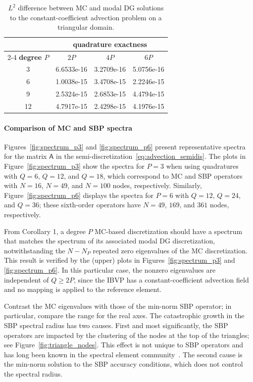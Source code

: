 \documentclass[pdflatex,sn-mathphys-num]{sn-jnl}%
\theoremstyle{thmstyleone}%
\theoremstyle{thmstyletwo}%
\theoremstyle{thmstylethree}%
\newcommand{\mat}[1]{\ensuremath{\mathsf{#1}}}
\begin{document}
\begin{table}[tbp]
\centering
\caption{$L^2$ difference between MC and modal DG solutions to the constant-coefficient advection problem on a triangular domain. \label{tab:l2diff_advection}}
\begin{tabular}{clll}
\rule{0ex}{5ex}
 & \multicolumn{3}{c}{\textbf{quadrature exactness}} \\ \cmidrule{2-4}
\textbf{degree $P$} & \multicolumn{1}{c}{$2P$} & \multicolumn{1}{c}{$4P$} & \multicolumn{1}{c}{$6P$} \\ \hline
\rule{0ex}{3ex}%
3 & 6.6533e-16 & 3.2709e-16 & 5.0756e-16\\[1ex]
6 & 1.0038e-15 & 3.4708e-15 & 2.2246e-15\\[1ex]
9 & 2.5324e-15 & 2.6853e-15 & 4.4794e-15\\[1ex]
12 & 4.7917e-15 & 2.4298e-15 & 4.1976e-15\\[1ex]\hline
\end{tabular}
\end{table}

\paragraph{Comparison of MC and SBP spectra}

Figures~\ref{fig:spectrum_p3} and \ref{fig:spectrum_p6} present representative spectra for the matrix $\mat{A}$ in the semi-discretization~\eqref{eq:advection_semidis}.  The plots in Figure~\ref{fig:spectrum_p3} show the spectra for $P=3$ when using quadratures with $Q=6$, $Q=12$, and $Q=18$, which correspond to MC and SBP operators with $N=16$, $N=49$, and $N=100$ nodes, respectively.  Similarly, Figure~\ref{fig:spectrum_p6} displays the spectra for $P=6$ with $Q=12$, $Q=24$, and $Q=36$; these sixth-order operators have $N=49$, $169$, and $361$ nodes, respectively.

From Corollary 1, a degree $P$ MC-based discretization should have a spectrum that matches the spectrum of its associated modal DG discretization, notwithstanding the $N-N_P$ repeated zero eigenvalues of the MC discretization.  This result is verified by the (upper) plots in Figures~\ref{fig:spectrum_p3} and \ref{fig:spectrum_p6}.  In this particular case, the nonzero eigenvalues are independent of $Q \geq 2P$, since the IBVP has a constant-coefficient advection field and no mapping is applied to the reference element.

Contrast the MC eigenvalues with those of the min-norm SBP operator; in particular, compare the range for the real axes.  The catastrophic growth in the SBP spectral radius has two causes.  First and most significantly, the SBP operators are impacted by the clustering of the nodes at the top of the triangles; see Figure~\ref{fig:triangle_nodes}.  This effect is not unique to SBP operators and has long been known in the spectral element community~\cite{Dubiner1991spectral}.  The second cause is the min-norm solution to the SBP accuracy conditions, which does not control the spectral radius.
\end{document}
